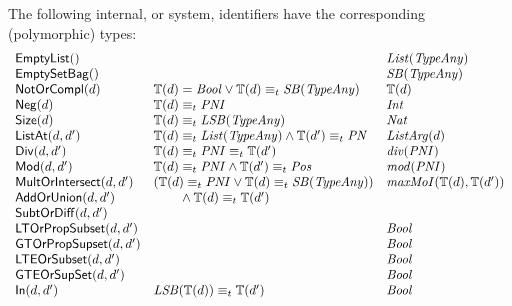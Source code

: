 \documentclass[fleqn,a4paper,dvips]{article}
\newcommand{\aterm}[1]{\mathsf{#1}}
\newcommand{\type}{\mathbb{T}}
\newcommand{\PNI}{\nm{PNI}}
\newcommand{\PN}{\nm{PN}}
\newcommand{\SB}{\nm{SB}}
\newcommand{\LSB}{\nm{LSB}}
\newcommand{\List}{\nm{List}}
\newcommand{\TypeAny}{\nm{TypeAny}}
\newcommand{\typecompat}{\equiv_t}
\newcommand{\Int}{\nm{Int}}
\newcommand{\Pos}{\nm{Pos}}
\begin{document}
The following internal, or system, identifiers have the corresponding (polymorphic) types:
\begin{displaymath}
\begin{array}{lll}
\aterm{EmptyList}()                  &                                                            & \List(\TypeAny)\\
\aterm{EmptySetBag}()                &                                                            & \SB(\TypeAny)\\
\aterm{NotOrCompl}(d)                & \type(d)=\Bool\lor\type(d)\typecompat\SB(\TypeAny)         & \type(d)\\
\aterm{Neg}(d)                       & \type(d)\typecompat\PNI                                    & \Int\\
\aterm{Size}(d)                      & \type(d)\typecompat\LSB(\TypeAny)                          & \Nat\\
\aterm{ListAt}(d, d')                & \type(d)\typecompat\List(\TypeAny)\land\type(d')\typecompat\PN & \nm{ListArg}(d)\\
\aterm{Div}(d, d')                   & \type(d)\typecompat\PNI\typecompat\type(d')                & \nm{div}(\PNI)\\
\aterm{Mod}(d, d')                   & \type(d)\typecompat\PNI\land\type(d')\typecompat\Pos       & \nm{mod}(\PNI)\\
\aterm{MultOrIntersect}(d, d')       & (\type(d)\typecompat\PNI\lor\type(d)\typecompat\SB(\TypeAny))
                                                                                                  & \nm{maxMoI}(\type(d),\type(d'))\\
\aterm{AddOrUnion}(d, d')            & \t2\land\type(d)\typecompat\type(d')                          &\\
\aterm{SubtOrDiff}(d, d')            &                                                            &\\
\aterm{LTOrPropSubset}(d, d')        &                                                            & \Bool\\
\aterm{GTOrPropSupset}(d, d')        &                                                            & \Bool\\
\aterm{LTEOrSubset}(d, d')           &                                                            & \Bool\\
\aterm{GTEOrSupSet}(d, d')           &                                                            & \Bool\\
\aterm{In}(d, d')                    & \LSB(\type(d))\typecompat\type(d')                         & \Bool\\

\end{array}
\end{displaymath}
\end{document}
